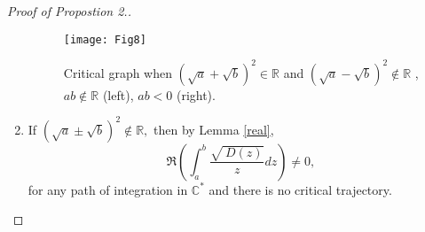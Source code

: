 \documentclass[12pt]{amsart}
\begin{document}
\begin{proof}[Proof of Propostion 2.]
\begin{enumerate}
\begin{figure}[h]
\begin{center}
\texttt{[image: Fig8]}
\caption[le titre]{ Critical graph when $(\sqrt{a}+\sqrt{b})^2\in \mathbb{R}$ and $(\sqrt{a}-\sqrt{b})^2\notin\mathbb{R}$ , $ab \notin\mathbb{R}$ (left), $ab < 0$ (right).}
\label{Fig8}
\end{center}
\end{figure}
\item If $\left( \sqrt{a}\pm \sqrt{b}\right) ^{2}\notin 
\mathbb{R}
,$ then by Lemma \ref{real}, 
\begin{equation*}
\Re \left( \int_{a}^{b}\dfrac{\sqrt{\ D\left( z\right) }}{z}dz\right) \neq 0,
\end{equation*}for any path of integration in $\mathbb{C}
^{\ast }$ and there is no critical trajectory.
\end{enumerate}
\end{proof}

\bigskip
\end{document}
